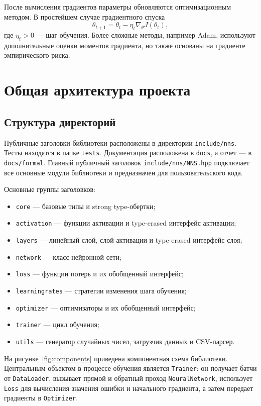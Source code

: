 \documentclass{article}
\begin{document}
После вычисления градиентов параметры обновляются оптимизационным
методом. В простейшем случае градиентного спуска
\[
    \theta_{t+1}
    =
    \theta_t
    -
    \eta_t
    \nabla_{\theta} J(\theta_t),
\]
где $\eta_t > 0$ --- шаг обучения. Более сложные методы, например
Adam, используют дополнительные оценки моментов градиента, но также
основаны на градиенте эмпирического риска.

\section{Общая архитектура проекта}

\subsection{Структура директорий}

Публичные заголовки библиотеки расположены в директории
\texttt{include/nns}. Тесты находятся в папке \texttt{tests}.
Документация расположена в \texttt{docs}, а отчет --- в
\texttt{docs/formal}. Главный
публичный заголовок \texttt{include/nns/NNS.hpp} подключает все
основные модули библиотеки и предназначен для пользовательского кода.

\newpage
Основные группы заголовков:
\begin{itemize}
    \item \texttt{core} --- базовые типы и strong type-обертки;
    \item \texttt{activation} --- функции активации и type-erased
        интерфейс активации;
    \item \texttt{layers} --- линейный слой,
        слой активации и type-erased интерфейс слоя;
    \item \texttt{network} --- класс нейронной сети;
    \item \texttt{loss} --- функции потерь и их обобщенный интерфейс; 
    \item \texttt{learningrates} --- стратегии изменения шага
        обучения;
    \item \texttt{optimizer} --- оптимизаторы и их обобщенный
        интерфейс; 
    \item \texttt{trainer} --- цикл обучения; 
    \item \texttt{utils} --- генератор случайных чисел,
        загрузчик данных и CSV-парсер.
\end{itemize}

На рисунке~\ref{fig:components} приведена компонентная схема
библиотеки. Центральным объектом в процессе обучения является
\texttt{Trainer}: он получает батчи от \texttt{DataLoader}, вызывает
прямой и обратный проход \texttt{NeuralNetwork}, использует
\texttt{Loss} для вычисления значения ошибки и начального градиента, а
затем передает градиенты в \texttt{Optimizer}.
\end{document}
